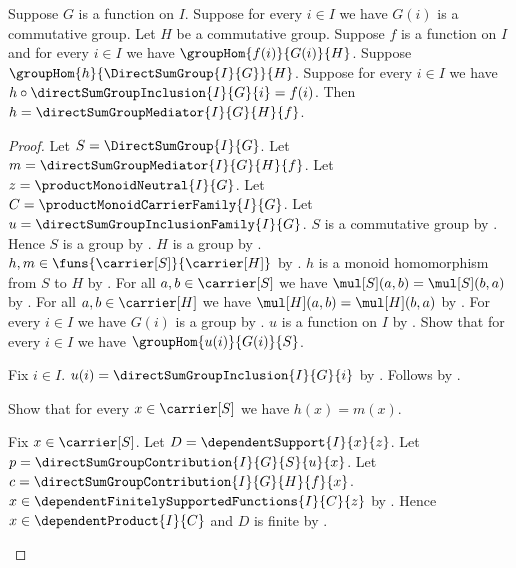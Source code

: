 \begin{theorem}\label{direct_sum_group_mediator_unique}
    Suppose $G$ is a function on $I$.
    Suppose for every $i\in I$ we have $G(i)$ is a commutative group.
    Let $H$ be a commutative group.
    Suppose $f$ is a function on $I$ and
        for every $i\in I$ we have $\groupHom{f(i)}{G(i)}{H}$.
    Suppose $\groupHom{h}{\DirectSumGroup{I}{G}}{H}$.
    Suppose for every $i\in I$ we have
        $h\circ\directSumGroupInclusion{I}{G}{i}=f(i)$.
    Then $h=\directSumGroupMediator{I}{G}{H}{f}$.
\end{theorem}
\begin{proof}
    Let $S=\DirectSumGroup{I}{G}$.
    Let $m=\directSumGroupMediator{I}{G}{H}{f}$.
    Let $z=\productMonoidNeutral{I}{G}$.
    Let $C=\productMonoidCarrierFamily{I}{G}$.
    Let $u=\directSumGroupInclusionFamily{I}{G}$.
    $S$ is a commutative group by .
    Hence $S$ is a group by .
    $H$ is a group by .
    $h,m\in\funs{\carrier[S]}{\carrier[H]}$ by
        .
    $h$ is a monoid homomorphism from $S$ to $H$ by
        .
    For all $a,b\in\carrier[S]$ we have
        $\mul[S](a,b)=\mul[S](b,a)$ by
        .
    For all $a,b\in\carrier[H]$ we have
        $\mul[H](a,b)=\mul[H](b,a)$ by
        .
    For every $i\in I$ we have $G(i)$ is a group by
        .
    $u$ is a function on $I$ by
        .
    Show that for every $i\in I$ we have $\groupHom{u(i)}{G(i)}{S}$.
    \begin{subproof}
        Fix $i\in I$.
        $u(i)=\directSumGroupInclusion{I}{G}{i}$ by
            .
        Follows by .
    \end{subproof}
    Show that for every $x\in\carrier[S]$ we have $h(x)=m(x)$.
    \begin{subproof}
        Fix $x\in\carrier[S]$.
        Let $D=\dependentSupport{I}{x}{z}$.
        Let $p=\directSumGroupContribution{I}{G}{S}{u}{x}$.
        Let $c=\directSumGroupContribution{I}{G}{H}{f}{x}$.
        $x\in\dependentFinitelySupportedFunctions{I}{C}{z}$ by
            .
        Hence $x\in\dependentProduct{I}{C}$ and $D$ is finite by
            .

\end{subproof}
\end{proof}
